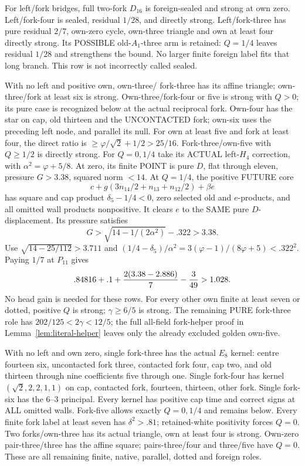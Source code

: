 \documentclass[11pt]{article}
\begin{document}
For left/fork bridges, full two-fork
\(D_{16}\) is foreign-sealed and strong
at own zero.
Left/fork-four is sealed, residual \(1/28\),
and directly strong.
Left/fork-three has pure residual \(2/7\),
own-zero cycle, own-three triangle and
own at least four directly strong.
Its POSSIBLE old-\(A_1\)-three arm is
retained: \(Q=1/4\) leaves residual
\(1/28\) and strengthens the bound.
No larger finite foreign label fits
that long branch.
This row is not incorrectly called sealed.

With no left and positive own, own-three/
fork-three has its affine triangle;
own-three/fork at least six is strong.
Own-three/fork-four or five is strong
with \(Q>0\); its pure case is recognized
below at the actual reciprocal fork.
Own-four has the star on cap, old
thirteen and the UNCONTACTED fork;
own-six uses the preceding left node,
and parallel its null.
For own at least five and fork at
least four, the direct ratio is
\(\ge\varphi/\sqrt2+1/2>25/16\).
Fork-three/own-five with \(Q\ge1/2\)
is directly strong.
For \(Q=0,1/4\) take its ACTUAL
left-\(H_4\) correction, with
\(\alpha^2=\varphi+5/8\).
At zero, its finite POINT is pure \(D\),
flat through eleven, pressure \(G>3.38\),
squared norm \(<14\).
At \(Q=1/4\), the positive FUTURE core
\[
             c+g(3n_{14}/2+n_{13}+n_{12}/2)+\beta e
\]
has square and cap product
\(\delta_5-1/4<0\), zero selected old
and \(e\)-products, and all omitted
wall products nonpositive.
It clears \(e\) to the SAME pure
\(D\)-displacement.
Its pressure satisfies
\[
             G>\sqrt{14-1/(2\alpha^2)}-.322>3.38 .
\]
Use \(\sqrt{14-25/112}>3.711\) and
\((1/4-\delta_5)/\alpha^2
=3(\varphi-1)/(8\varphi+5)<.322^2\).
Paying \(1/7\) at \(P_{11}\) gives
\[
                 .84816+.1+{2(3.38-2.886)\over7}-{3\over49}>1.028 .
\]
No head gain is needed for these rows.
For every other own finite at least
seven or dotted, positive \(Q\) is
strong; \(\gamma\ge6/5\) is strong.
The remaining PURE fork-three role
has \(202/125<2\gamma<12/5\);
the full all-field fork-helper proof
in Lemma~\ref{lem:literal-helper}
leaves only the already excluded golden
own-five.

With no left and own zero, single
fork-three has the actual \(E_8\) kernel:
centre fourteen six, uncontacted fork
three, contacted fork four, cap two,
and old thirteen through nine
coefficients five through one.
Single fork-four has kernel
\((\sqrt2,2,2,1,1)\) on cap, contacted
fork, fourteen, thirteen, other fork.
Single fork-six has the \(6\)--\(3\)
principal.
Every kernel has positive cap time and
correct signs at ALL omitted walls.
Fork-five allows exactly \(Q=0,1/4\)
and remains below.
Every finite fork label at least seven
has \(\delta^2>.81\); retained-white
positivity forces \(Q=0\).
Two forks/own-three has its actual
triangle, own at least four is strong.
Own-zero pair-three/three has the affine
square; pairs-three/four and three/five
have \(Q=0\).
These are all remaining finite, native,
parallel, dotted and foreign roles.
\end{document}
